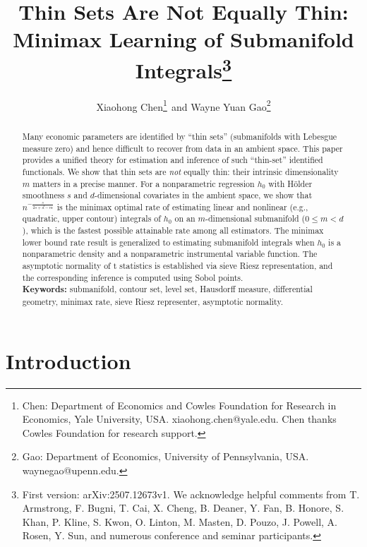 \documentclass[12pt,american]{article}
\theoremstyle{definition}
\theoremstyle{plain}
\theoremstyle{definition}
\theoremstyle{plain}
\theoremstyle{plain}
\theoremstyle{plain}
\theoremstyle{plain}
\theoremstyle{plain}
\begin{document}
\sloppy

\title{%
Thin Sets Are Not Equally Thin:\\ Minimax Learning of Submanifold Integrals\footnote{First version: arXiv:2507.12673v1. We acknowledge helpful comments from T. Armstrong, F. Bugni, T. Cai, X. Cheng, B. Deaner, Y. Fan, B. Honore, S. Khan, P. Kline, S. Kwon, O. Linton, M. Masten, D. Pouzo, J. Powell, A. Rosen, Y. Sun, and numerous conference and seminar participants.}}
\author{Xiaohong Chen\footnote{Chen: Department of Economics and Cowles Foundation for Research in Economics,
    Yale University, USA.
  xiaohong.chen@yale.edu. Chen thanks Cowles Foundation for research support.}$\ \ $and Wayne Yuan Gao\footnote{Gao: Department of Economics, University of Pennsylvania, USA.
waynegao@upenn.edu.}}
\maketitle

\begin{abstract}
  \noindent Many economic parameters are identified by ``thin sets'' (submanifolds with Lebesgue measure zero)  and hence difficult to recover from data in an ambient space. This paper provides a unified theory for estimation and inference of such ``thin-set'' identified functionals. We show that thin sets are \emph{not} equally thin: their intrinsic dimensionality $m$ matters in a precise manner. For a nonparametric regression $h_0$ with H\"{o}lder smoothness $s$ and $d$-dimensional covariates in the ambient space, we show that $n^{-\frac{s}{2s+d-m}}$ is the minimax optimal rate of estimating linear and nonlinear (e.g., quadratic, upper contour) integrals of $h_0$ on an $m$-dimensional submanifold ($0\leq m < d$), which is the fastest possible attainable rate among all estimators. The minimax lower bound rate result is generalized to estimating submanifold integrals when $h_0$ is a nonparametric density and a nonparametric instrumental variable function. The asymptotic normality of t statistics is established via sieve Riesz representation, and the corresponding inference is computed using Sobol points. \medskip
  \\
  \textbf{Keywords:} submanifold, contour set, level set, Hausdorff measure, differential geometry, minimax rate, sieve Riesz representer, asymptotic normality.

\end{abstract}


\section{\label{sec:Intro}Introduction}
\end{document}
